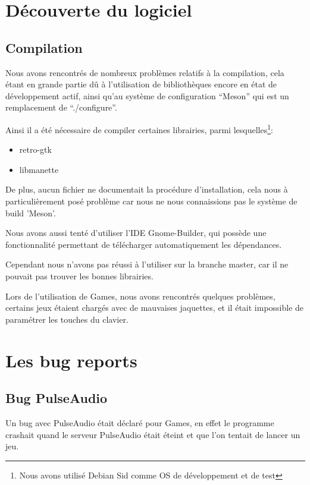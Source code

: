 \documentclass[12pt]{report}
\begin{document}
\section{Découverte du logiciel}
\subsection{Compilation}
Nous avons rencontrés de nombreux problèmes relatifs à la compilation,
cela étant en grande partie dû à l'utilisation de bibliothèques encore en
état de développement actif, ainsi qu'au système de configuration
``Meson'' qui est un remplacement de ``./configure''.

Ainsi il a été nécessaire de compiler certaines librairies, parmi
lesquelles\footnote{Nous avons utilisé Debian Sid comme OS de développement et de test}:
\begin{itemize}
\item retro-gtk
\item libmanette
\end{itemize}

De plus, aucun fichier ne documentait la procédure d'installation,
cela nous à particulièrement posé problème car nous ne nous
connaissions pas le système de build 'Meson'.

Nous avons aussi tenté d'utiliser l'IDE Gnome-Builder, qui possède une
fonctionnalité permettant de télécharger automatiquement les
dépendances.

Cependant nous n'avons pas réussi à l'utiliser sur la branche master,
car il ne pouvait pas trouver les bonnes librairies.

Lors de l'utilisation de Games, nous avons rencontrés quelques
problèmes, certains jeux étaient chargés avec de mauvaises jaquettes,
et il était impossible de paramétrer les touches du clavier.

\section{Les bug reports}
\subsection{Bug PulseAudio}
Un bug avec PulseAudio était déclaré pour Games, en effet le programme crashait
quand le serveur PulseAudio était éteint et que l'on tentait de lancer
un jeu.
\end{document}
